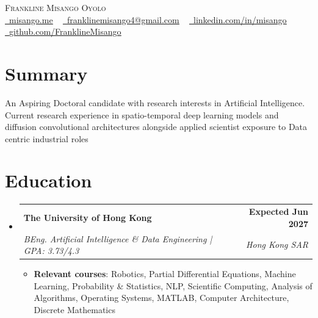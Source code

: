 \documentclass[letterpaper,11pt]{article}
\makeatletter
\newcommand{\resumeItem}[1]{
  \item\small{
    {#1 \vspace{-2pt}}
  }
}
\newcommand{\resumeSubheading}[4]{
  \vspace{-2pt}\item
    \begin{tabular*}{1.0\textwidth}[t]{l@{\extracolsep{\fill}}r}
      \textbf{#1} & \textbf{\small #2} \\
      \textit{\small#3} & \textit{\small #4} \\
    \end{tabular*}\vspace{-7pt}
}
\newcommand{\resumeSubHeadingListStart}{\begin{itemize}[leftmargin=0.0in, label={}]}
\newcommand{\resumeSubHeadingListEnd}{\end{itemize}}
\newcommand{\resumeItemListStart}{\begin{itemize}}
\newcommand{\resumeItemListEnd}{\end{itemize}\vspace{-5pt}}
\makeatother
\begin{document}
\begin{center}
    {\Huge \scshape Frankline Misango Oyolo} \\ \vspace{1pt}
    \small \href{https://misango.me}{\raisebox{-0.2\height}\faGlobe\ \underline{misango.me}} ~
    \href{mailto:franklinemisango4@gmail.com}{\raisebox{-0.2\height}\faEnvelope\ \underline{franklinemisango4@gmail.com}} ~ 
    \href{https://linkedin.com/in/misango}{\raisebox{-0.2\height}\faLinkedin\ \underline{linkedin.com/in/misango}} ~
    \href{https://github.com/FranklineMisango}{\raisebox{-0.2\height}\faGithub\ \underline{github.com/FranklineMisango}}
    \vspace{-8pt}
\end{center}

\section{Summary}
\small
An Aspiring Doctoral candidate with research interests in Artificial Intelligence. Current research experience in spatio-temporal deep learning models and diffusion convolutional architectures alongside applied scientist exposure to Data centric industrial roles

\vspace{-11pt}

\section{Education}
  \resumeSubHeadingListStart
    \resumeSubheading
      {The University of Hong Kong}{Expected Jun 2027}
      {BEng. Artificial Intelligence \& Data Engineering | GPA: 3.73/4.3}{Hong Kong SAR}
      \resumeItemListStart
        \resumeItem{\textbf{Relevant courses}: Robotics, Partial Differential Equations, Machine Learning, Probability \& Statistics, NLP, Scientific Computing, Analysis of Algorithms, Operating Systems, MATLAB, Computer Architecture, Discrete Mathematics}
      \resumeItemListEnd
  \resumeSubHeadingListEnd
\vspace{-18pt}

\end{document}
